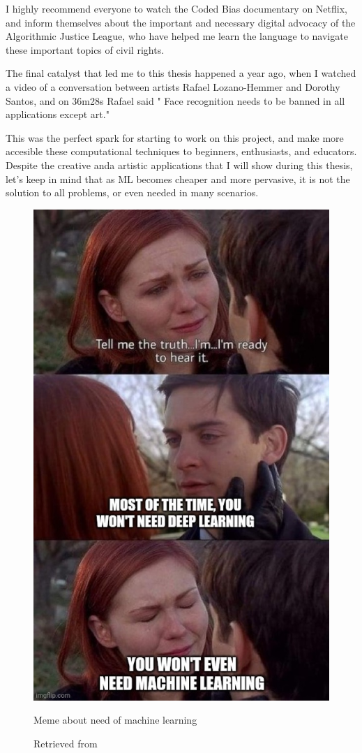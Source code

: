 I highly recommend everyone to watch the Coded Bias documentary on Netflix, and inform themselves about the important and necessary digital advocacy of the Algorithmic Justice League, who have helped me learn the language to navigate these important topics of civil rights.

The final catalyst that led me to this thesis happened a year ago, when I watched a video \cite{website-talk-technology-and-public-art-rafael-lozano-hemmer} of a conversation between artists Rafael Lozano-Hemmer and Dorothy Santos, and on 36m28s Rafael said " Face recognition needs to be banned in all applications except art."

This was the perfect spark for starting to work on this project, and make more accesible these computational techniques to beginners, enthusiasts, and educators. Despite the creative anda artistic applications that I will show during this thesis, let's keep in mind that as \acrshort{ML} becomes cheaper and more pervasive, it is not the solution to all problems, or even needed in many scenarios.

\begin{figure}[ht]
  \centering
  \includegraphics[width=0.75\linewidth,height=0.40\textheight,keepaspectratio]{images/meme-spider-man.jpg}
  \caption{Meme about need of machine learning}
  \caption*{Retrieved from \cite{website-twitter-dynamicwebpaige-meme}}
  \label{fig:meme-spider-man}
\end{figure}

